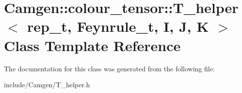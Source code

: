 \hypertarget{a00525}{\section{Camgen\-:\-:colour\-\_\-tensor\-:\-:T\-\_\-helper$<$ rep\-\_\-t, Feynrule\-\_\-t, I, J, K $>$ Class Template Reference}
\label{a00525}
}


The documentation for this class was generated from the following file\-:\begin{DoxyCompactItemize}
\item 
include/\-Camgen/T\-\_\-helper.\-h\end{DoxyCompactItemize}
